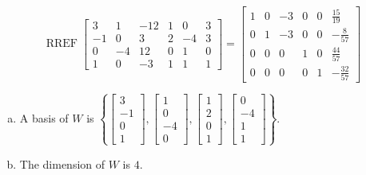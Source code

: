 \begin{exerciseAnswer} 


\[\operatorname{RREF} \left[\begin{array}{cccccc}
3 & 1 & -12 & 1 & 0 & 3 \\
-1 & 0 & 3 & 2 & -4 & 3 \\
0 & -4 & 12 & 0 & 1 & 0 \\
1 & 0 & -3 & 1 & 1 & 1
\end{array}\right] = \left[\begin{array}{cccccc}
1 & 0 & -3 & 0 & 0 & \frac{15}{19} \\
0 & 1 & -3 & 0 & 0 & -\frac{8}{57} \\
0 & 0 & 0 & 1 & 0 & \frac{44}{57} \\
0 & 0 & 0 & 0 & 1 & -\frac{32}{57}
\end{array}\right] \]


\begin{enumerate}[(a)]
\item A basis of \(W\) is \( \left\{ \left[\begin{array}{c}
3 \\
-1 \\
0 \\
1
\end{array}\right] , \left[\begin{array}{c}
1 \\
0 \\
-4 \\
0
\end{array}\right] , \left[\begin{array}{c}
1 \\
2 \\
0 \\
1
\end{array}\right] , \left[\begin{array}{c}
0 \\
-4 \\
1 \\
1
\end{array}\right] \right\} \).
\item The dimension of \(W\) is \( 4 \).
\end{enumerate}
    
\end{exerciseAnswer}
    
